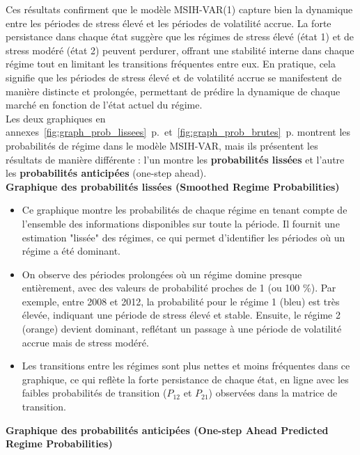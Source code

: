 Ces résultats confirment que le modèle MSIH-VAR(1) capture bien la dynamique entre les périodes de stress élevé et les périodes de volatilité accrue. La forte persistance dans chaque état suggère que les régimes de stress élevé (état 1) et de stress modéré (état 2) peuvent perdurer, offrant une stabilité interne dans chaque régime tout en limitant les transitions fréquentes entre eux. En pratique, cela signifie que les périodes de stress élevé et de volatilité accrue se manifestent de manière distincte et prolongée, permettant de prédire la dynamique de chaque marché en fonction de l'état actuel du régime.\\

Les deux graphiques en annexes~\autoref{fig:graph_prob_lissees}~p.\pageref{fig:graph_prob_lissees}~et~\autoref{fig:graph_prob_brutes}~p.\pageref{fig:graph_prob_brutes} montrent les probabilités de régime dans le modèle MSIH-VAR, mais ils présentent les résultats de manière différente : l'un montre les \textbf{probabilités lissées} et l'autre les \textbf{probabilités anticipées} (one-step ahead).\\

\textbf{Graphique des probabilités lissées (Smoothed Regime Probabilities)}

\begin{itemize}
    \item Ce graphique montre les probabilités de chaque régime en tenant compte de l'ensemble des informations disponibles sur toute la période. Il fournit une estimation "lissée" des régimes, ce qui permet d'identifier les périodes où un régime a été dominant.
    \item On observe des périodes prolongées où un régime domine presque entièrement, avec des valeurs de probabilité proches de 1 (ou 100 \%). Par exemple, entre 2008 et 2012, la probabilité pour le régime 1 (bleu) est très élevée, indiquant une période de stress élevé et stable. Ensuite, le régime 2 (orange) devient dominant, reflétant un passage à une période de volatilité accrue mais de stress modéré.
    \item Les transitions entre les régimes sont plus nettes et moins fréquentes dans ce graphique, ce qui reflète la forte persistance de chaque état, en ligne avec les faibles probabilités de transition (\( P_{12} \) et \( P_{21} \)) observées dans la matrice de transition.
\end{itemize}

\textbf{Graphique des probabilités anticipées (One-step Ahead Predicted Regime Probabilities)}

